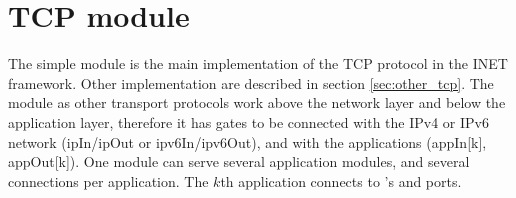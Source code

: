 % 
% 
% 
% 
% 
% 
% 
% 
% 
% 


\section{TCP module}

The  simple module is the main implementation of the TCP protocol in the INET framework.
Other implementation are described in section \ref{sec:other_tcp}.
The  module as other transport protocols work above the network layer and below the application
layer, therefore it has gates to be connected with the IPv4 or IPv6 network (ipIn/ipOut or ipv6In/ipv6Out),
and with the applications (appIn[k], appOut[k]).
One  module can serve several application modules, and several
connections per application. The $k$th application connects to 's
 and  ports. 

